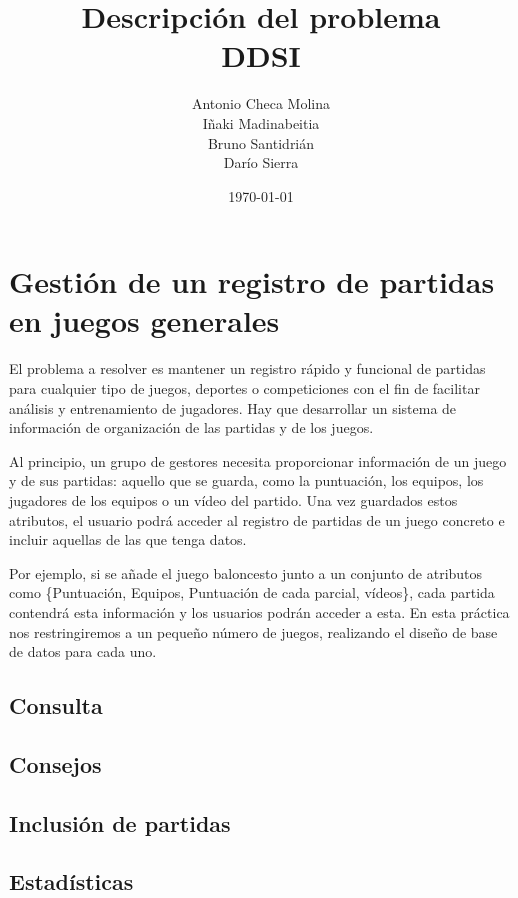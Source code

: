 \documentclass[a4paper, 11pt]{article}
\title{\Huge \textbf{Descripción del problema\\DDSI}}
\author{Antonio Checa Molina \\ Iñaki Madinabeitia \\ Bruno Santidrián \\ Darío Sierra}
\date{\today}
\begin{document}
\maketitle
\tableofcontents

\newpage
\section{Gestión de un registro de partidas en juegos generales}

El problema a resolver es mantener un registro rápido y funcional de partidas para cualquier tipo de juegos, deportes o competiciones con el fin de facilitar análisis y entrenamiento de jugadores. Hay que desarrollar un sistema de información de organización de las partidas y de los juegos.

Al principio, un grupo de gestores necesita proporcionar información de un juego y de sus partidas: aquello que se guarda, como la puntuación, los equipos, los jugadores de los equipos o un vídeo del partido. Una vez guardados estos atributos, el usuario podrá acceder al registro de partidas de un juego concreto e incluir aquellas de las que tenga datos. 

Por ejemplo, si se añade el juego baloncesto junto a un conjunto de atributos como \{Puntuación, Equipos, Puntuación de cada parcial, vídeos\}, cada partida contendrá esta información y los usuarios podrán acceder a esta. En esta práctica nos restringiremos a un pequeño número de juegos, realizando el diseño de base de datos para cada uno.

\subsection{Consulta}


\subsection{Consejos}


\subsection{Inclusión de partidas}


\subsection{Estadísticas}

\end{document}
